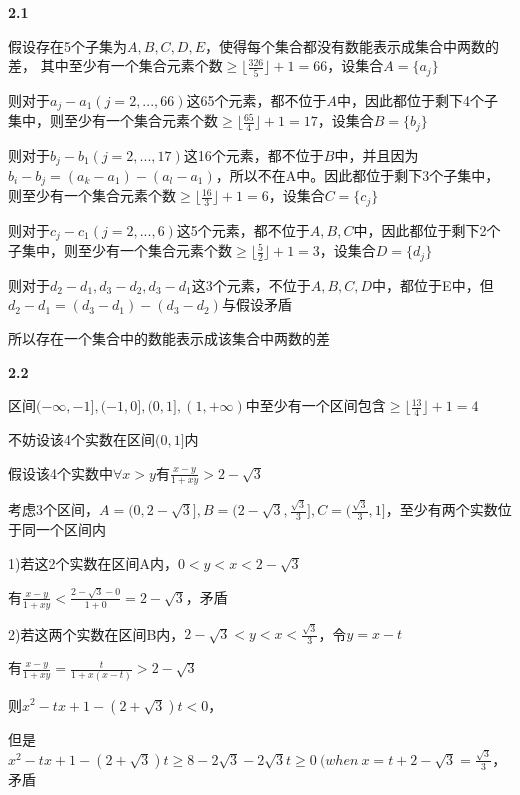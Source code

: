
\vspace{5mm} %
\noindent{}\textbf{2.1}

假设存在5个子集为$A,B,C,D,E$，使得每个集合都没有数能表示成集合中两数的差，
其中至少有一个集合元素个数$\geq \lfloor\frac{326}{5}\rfloor+1=66$，设集合$A=\{a_j\}$

则对于$a_{j}-a_1(j=2,...,66)$这65个元素，都不位于$A$中，因此都位于剩下4个子集中，则至少有一个集合元素个数$\geq \lfloor\frac{65}{4}\rfloor+1=17$，设集合$B=\{b_j\}$

则对于$b_{j}-b_1(j=2,...,17)$这16个元素，都不位于$B$中，并且因为$b_{i}-b_{j}=(a_{k}-a_{1})-(a_{l}-a_{1})$，所以不在A中。因此都位于剩下3个子集中，则至少有一个集合元素个数$\geq \lfloor\frac{16}{3}\rfloor+1=6$，设集合$C=\{c_j\}$

则对于$c_{j}-c_1(j=2,...,6)$这5个元素，都不位于$A,B,C$中，因此都位于剩下2个子集中，则至少有一个集合元素个数$\geq \lfloor\frac{5}{2}\rfloor+1=3$，设集合$D=\{d_j\}$

则对于$d_2-d_1,d_3-d_2,d_3-d_1$这3个元素，不位于$A,B,C,D$中，都位于E中，但$d_2-d_1=(d_3-d_1)-(d_3-d_2)$与假设矛盾

所以存在一个集合中的数能表示成该集合中两数的差

\vspace{5mm} %
\noindent{}\textbf{2.2}

区间$(-\infty,-1],(-1,0],(0,1],(1,+\infty)$中至少有一个区间包含$\geq \lfloor\frac{13}{4}\rfloor+1=4$

不妨设该4个实数在区间$(0,1]$内

假设该4个实数中${\forall} x>y$有$\frac{x-y}{1+xy} > 2-\sqrt{3}$

考虑3个区间，$A=(0,2-\sqrt{3}],B=(2-\sqrt{3},\frac{\sqrt{3}}{3}],C=(\frac{\sqrt{3}}{3},1]$，至少有两个实数位于同一个区间内

1)若这2个实数在区间A内，$0<y<x<2-\sqrt{3}$

有$\frac{x-y}{1+xy} < \frac{2-\sqrt{3}-0}{1+0} = 2-\sqrt{3}$，矛盾

2)若这两个实数在区间B内，$2-\sqrt{3}<y<x<\frac{\sqrt{3}}{3}$，令$y=x-t$

有$\frac{x-y}{1+xy} = \frac{t}{1+x(x-t)} > 2-\sqrt{3}$

则$x^2-tx+1-(2+\sqrt{3})t < 0$，

但是$x^2-tx+1-(2+\sqrt{3})t \geq 8-2\sqrt{3}-2\sqrt{3}t \geq 0 \ (when\  x=t+2-\sqrt{3}=\frac{\sqrt{3}}{3}$，矛盾



